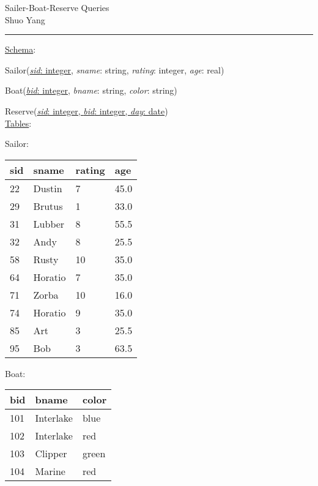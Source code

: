 \documentclass[10pt]{article}
\def\Author{Shuo Yang}
\begin{document}
\noindent

\begin{center}
  Sailer-Boat-Reserve Queries\\
  \Author\\
\end{center}

\hrule\smallskip

\vspace{1em}
\underline{Schema}:
\vspace{1em}

Sailor(\underline{\emph{sid}: integer}, \emph{sname}: string,
\emph{rating}: integer, \emph{age}: real)

Boat(\underline{\emph{bid}: integer}, \emph{bname}: string,
\emph{color}: string)

Reserve(\underline{\emph{sid}: integer, \emph{bid}: integer,
  \emph{day}: date}) \\

\underline{Tables}:
\vspace{1em}

Sailor:
\vspace{0.5em}

\begin{tabular} {| l | l | l | l |}
  \hline
  sid & sname & rating & age\\\hline

  22 & Dustin & 7 & 45.0\\
  29 & Brutus & 1 & 33.0\\
  31 & Lubber & 8 & 55.5\\
  32 & Andy & 8 & 25.5\\
  58 & Rusty & 10 & 35.0\\
  64 & Horatio & 7 & 35.0\\
  71 & Zorba & 10 & 16.0\\
  74 & Horatio & 9 & 35.0\\
  85 & Art & 3 & 25.5\\
  95 & Bob & 3 & 63.5\\\hline
\end{tabular}

\vspace{1em}
Boat:
\vspace{0.5em}

\begin{tabular} {| l | l | l |}
  \hline
  bid & bname & color \\\hline

  101 & Interlake & blue\\
  102 & Interlake & red\\
  103 & Clipper & green\\
  104 & Marine & red\\\hline
\end{tabular}
\end{document}
